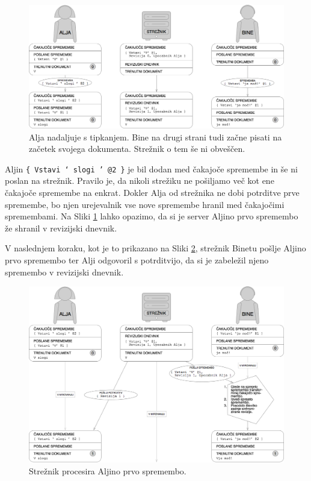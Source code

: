 \documentclass[a4paper, 12pt, twoside]{book}
\begin{document}
\begin{figure}[placement h]
\begin{center}
\includegraphics[width=14cm]{pc2.png}
\end{center}
\caption{Alja nadaljuje s tipkanjem. Bine na drugi strani tudi začne pisati na začetek svojega dokumenta. Strežnik o tem še ni obveščen.}
\label{pc2}
\end{figure}

Aljin {\tt \{ Vstavi ‘ slogi ’ @2 \}} je bil dodan med čakajoče spremembe in še ni poslan na strežnik. Pravilo je, da nikoli strežiku ne pošiljamo več kot ene čakajoče spremembe na enkrat. Dokler Alja od strežnika ne dobi potrditve prve spremembe, bo njen urejevalnik vse nove spremembe hranil med čakajočimi spremembami. Na Sliki \ref{pc2} lahko opazimo, da si je server Aljino prvo spremembo že shranil v revizijski dnevnik.

\pagebreak

V naslednjem koraku, kot je to prikazano na Sliki \ref{pc3}, strežnik Binetu pošlje Aljino prvo spremembo ter Alji odgovoril s potrditvijo, da si je zabeležil njeno spremembo v revizijski dnevnik.

\begin{figure}[placement h]
\begin{center}
\includegraphics[width=14cm]{pc3.png}
\end{center}
\caption{Strežnik procesira Aljino prvo spremembo.}
\label{pc3}
\end{figure}
\end{document}
